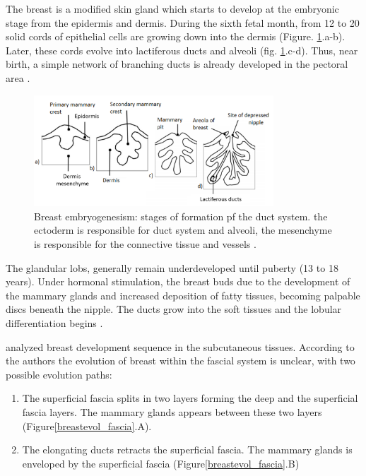 The breast is a modified skin gland which starts to develop at the embryonic stage from the epidermis and dermis.  During the sixth fetal month, from 12 to 20 solid cords of epithelial cells are growing down into the dermis (Figure. \ref{breastembryogenesis}.a-b). Later, these cords evolve into lactiferous ducts and alveoli (fig. \ref{breastembryogenesis}.c-d). Thus, near birth, a simple network of branching ducts is already developed in the pectoral area \citep{skandalakis_embryology_2009}.
 

 \begin{figure}[!h]
 \centering
\includegraphics[width=0.8\textwidth,keepaspectratio]{figures/breast_evolution_my.png} 
\caption[Breast embryogenesis: embryonic evolution of duct system. The epidermis is responsible for the creation of ductal system and alveoli, the dermis mesenchyme is responsible for the creation of connective tissue and vessels] {Breast embryogenesism: stages of formation pf the duct system. the ectoderm is responsible for duct system and alveoli, the mesenchyme is responsible for the connective tissue and vessels \citep{skandalakis_embryology_2009}.}
\label{breastembryogenesis}
\end{figure}


The glandular lobs, generally remain underdeveloped until puberty (13 to 18 years). Under hormonal stimulation, the breast buds due to the development of the mammary glands and increased deposition of fatty tissues, becoming palpable discs beneath the nipple. The ducts grow into the soft tissues and the lobular differentiation begins \citep{kopans2007breast}. 

\cite{kopans2007breast} analyzed breast development sequence in the subcutaneous tissues. According to the authors the evolution of breast within the fascial system is unclear, with two possible evolution paths: 
\begin{enumerate}[label=(\Alph*)]
\item The superficial fascia splits in two layers forming the deep and the superficial fascia layers. The mammary glands appears between these two layers (Figure\ref{breastevol_fascia}.A).
\item The elongating ducts retracts the superficial fascia.  The mammary glands is enveloped by the superficial fascia (Figure\ref{breastevol_fascia}.B)
\end{enumerate}


